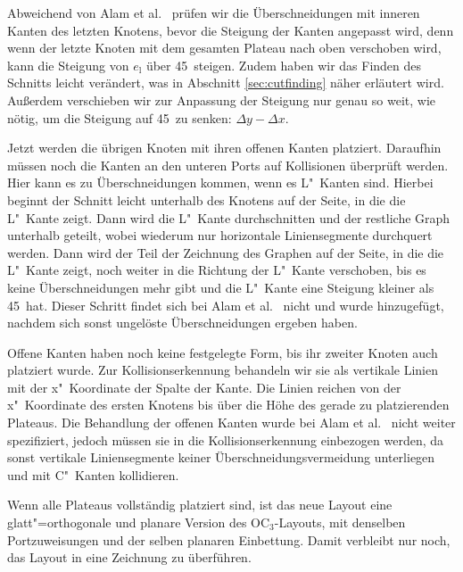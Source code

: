 \documentclass[a4paper]{scrreprt}
\theoremstyle{definition}
\begin{document}

Abweichend von Alam et al.~\cite{smooth-13} prüfen wir die Überschneidungen mit inneren Kanten des letzten Knotens, bevor die Steigung der Kanten angepasst wird, denn wenn der letzte Knoten mit dem gesamten Plateau nach oben verschoben wird, kann die Steigung von $e_\text{l}$ über 45\textdegree\ steigen. Zudem haben wir das Finden des Schnitts leicht verändert, was in Abschnitt \ref{sec:cutfinding} näher erläutert wird. Außerdem verschieben wir zur Anpassung der Steigung nur genau so weit, wie nötig, um die Steigung auf 45\textdegree\ zu senken: $\Delta y - \Delta x$.

Jetzt werden die übrigen Knoten mit ihren offenen Kanten platziert. Daraufhin müssen noch die Kanten an den unteren Ports auf Kollisionen überprüft werden. Hier kann es zu Überschneidungen kommen, wenn es L"~Kanten sind. Hierbei beginnt der Schnitt leicht unterhalb des Knotens auf der Seite, in die die L"~Kante zeigt. Dann wird die L"~Kante durchschnitten und der restliche Graph unterhalb geteilt, wobei wiederum nur horizontale Liniensegmente durchquert werden. Dann wird der Teil der Zeichnung des Graphen auf der Seite, in die die L"~Kante zeigt, noch weiter in die Richtung der L"~Kante verschoben, bis es keine Überschneidungen mehr gibt und die L"~Kante eine Steigung kleiner als 45\textdegree\ hat. Dieser Schritt findet sich bei Alam et al.~\cite{smooth-13} nicht und wurde hinzugefügt, nachdem sich sonst ungelöste Überschneidungen ergeben haben.

Offene Kanten haben noch keine festgelegte Form, bis ihr zweiter Knoten auch platziert wurde. Zur Kollisionserkennung behandeln wir sie als vertikale Linien mit der x"~Koordinate der Spalte der Kante. Die Linien reichen von der x"~Koordinate des ersten Knotens bis über die Höhe des gerade zu platzierenden Plateaus. Die Behandlung der offenen Kanten wurde bei Alam et al.~\cite{smooth-13} nicht weiter spezifiziert, jedoch müssen sie in die Kollisionserkennung einbezogen werden, da sonst vertikale Liniensegmente keiner Überschneidungsvermeidung unterliegen und mit C"~Kanten kollidieren.

Wenn alle Plateaus vollständig platziert sind, ist das neue Layout eine glatt"=orthogonale und planare Version des OC$_3$-Layouts, mit denselben Portzuweisungen und der selben planaren Einbettung. Damit verbleibt nur noch, das Layout in eine Zeichnung zu überführen. 

\end{document}
